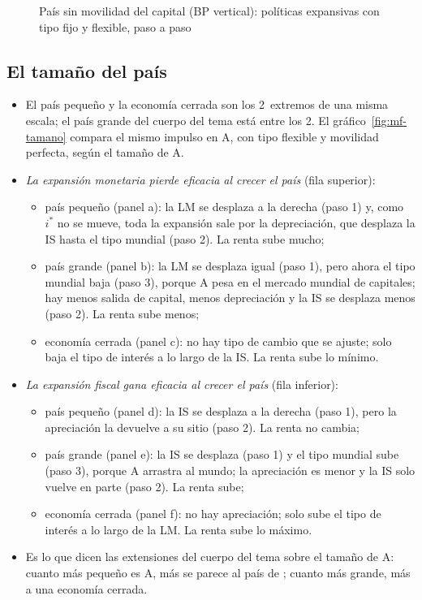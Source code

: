 \documentclass[11pt]{article}
\begin{document}
\begin{figure}[H]
\centering
\caption{País sin movilidad del capital (BP vertical): políticas expansivas con tipo fijo y flexible, paso a paso}\label{fig:mf-movilidad-nula}
\end{figure}

\subsection*{El tamaño del país}

\begin{itemize}
\item El país pequeño y la economía cerrada son los 2~extremos de una misma escala; el país grande del cuerpo del tema está entre los 2. El gráfico~\ref{fig:mf-tamano} compara el mismo impulso en A, con tipo flexible y movilidad perfecta, según el tamaño de A.
\item \emph{La expansión monetaria pierde eficacia al crecer el país} (fila superior):
  \begin{itemize}
  \item país pequeño (panel a): la LM se desplaza a la derecha (paso 1) y, como $i^*$ no se mueve, toda la expansión sale por la depreciación, que desplaza la IS hasta el tipo mundial (paso 2). La renta sube mucho;
  \item país grande (panel b): la LM se desplaza igual (paso 1), pero ahora el tipo mundial baja (paso 3), porque A pesa en el mercado mundial de capitales; hay menos salida de capital, menos depreciación y la IS se desplaza menos (paso 2). La renta sube menos;
  \item economía cerrada (panel c): no hay tipo de cambio que se ajuste; solo baja el tipo de interés a lo largo de la IS. La renta sube lo mínimo.
  \end{itemize}
\item \emph{La expansión fiscal gana eficacia al crecer el país} (fila inferior):
  \begin{itemize}
  \item país pequeño (panel d): la IS se desplaza a la derecha (paso 1), pero la apreciación la devuelve a su sitio (paso 2). La renta no cambia;
  \item país grande (panel e): la IS se desplaza (paso 1) y el tipo mundial sube (paso 3), porque A arrastra al mundo; la apreciación es menor y la IS solo vuelve en parte (paso 2). La renta sube;
  \item economía cerrada (panel f): no hay apreciación; solo sube el tipo de interés a lo largo de la LM. La renta sube lo máximo.
  \end{itemize}
\item Es lo que dicen las extensiones del cuerpo del tema sobre el tamaño de A: cuanto más pequeño es A, más se parece al país de \textcite{Mundell1963Capital}; cuanto más grande, más a una economía cerrada.
\end{itemize}
\end{document}
